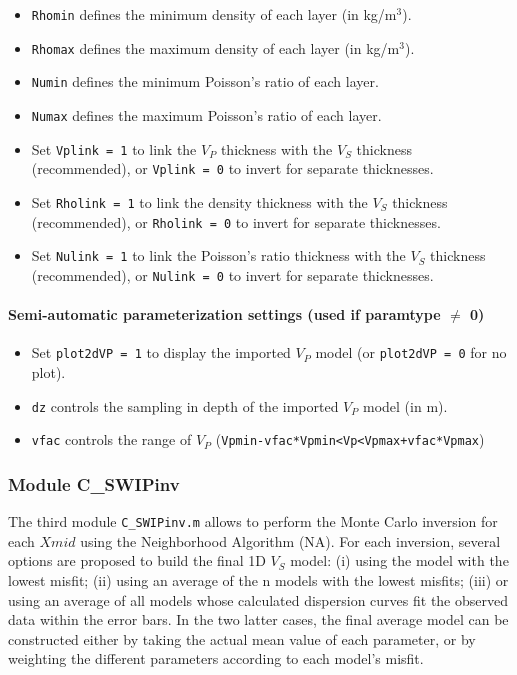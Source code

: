 \documentclass[twoside,a4paper]{article}
\begin{document}
\begin{itemize}[leftmargin=*]
\item \verb|Rhomin| defines the minimum density of each layer (in kg/m$^3$).

\item \verb|Rhomax| defines the maximum density of each layer (in kg/m$^3$).

\item \verb|Numin| defines the minimum Poisson's ratio of each layer.

\item \verb|Numax| defines the maximum Poisson's ratio of each layer.\\[2ex]

\item Set \verb|Vplink = 1| to link the $V_P$ thickness with the $V_S$ thickness (recommended), or \verb|Vplink = 0| to invert for separate thicknesses.

\item Set \verb|Rholink = 1| to link the density thickness with the $V_S$ thickness (recommended), or \verb|Rholink = 0| to invert for separate thicknesses.

\item Set \verb|Nulink = 1| to link the Poisson's ratio thickness with the $V_S$ thickness (recommended), or \verb|Nulink = 0| to invert for separate thicknesses.
\end{itemize}

\paragraph{Semi-automatic parameterization settings (used if paramtype $\neq$ 0)}
\begin{itemize}[leftmargin=*]
\setlength\itemsep{2ex}
\item Set \verb|plot2dVP = 1| to display the imported $V_P$ model (or \verb|plot2dVP = 0| for no plot).

\item \verb|dz| controls the sampling in depth of the imported $V_P$ model (in m).

\item \verb|vfac| controls the range of $V_P$ (\verb|Vpmin-vfac*Vpmin<Vp<Vpmax+vfac*Vpmax|)

\end{itemize}

\subsubsection{Module C\_SWIPinv}
\label{sec:moduleC}
The third module \verb|C_SWIPinv.m| allows to perform the Monte Carlo inversion for each $Xmid$ using the Neighborhood Algorithm (NA). For each inversion, several options are proposed to build the final 1D $V_S$ model: (i) using the model with the lowest misfit; (ii) using an average of the n models with the lowest misfits; (iii) or using an average of all models whose calculated dispersion curves fit the observed data within the error bars. In the two latter cases, the final average model can be constructed either by taking the actual mean value of each parameter, or by weighting the different parameters according to each model’s misfit.
\end{document}
